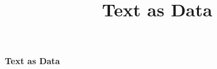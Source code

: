 \documentclass{article}
\title{Text as Data}
\author{}
\date{}
\begin{document}
\small

\noindent \textbf{Text as Data}
\end{document}
